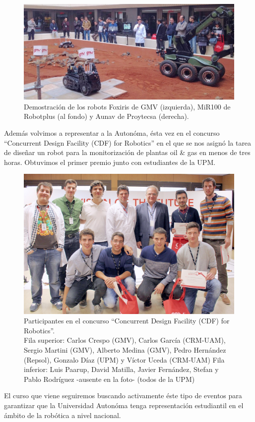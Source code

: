 \documentclass[12pt,twoside]{report}
\begin{document}
\begin{figure}[hbtp]
\centerline{\includegraphics[width=0.75\linewidth]{fotos/2015_V_JornadaRobotica_GMV}}
\caption*{
Demostración de los robots Foxiris de GMV (izquierda), MiR100 de Robotplus (al fondo) y Aunav de Proytecsa (derecha).
}
\end{figure}

Además volvimos a representar a la Autonóma, ésta vez en el concurso ``Concurrent Design Facility (CDF) for Robotics'' en el que se nos asignó la tarea de diseñar un robot para la monitorización de plantas oil \& gas en menos de tres horas. Obtuvimos el primer premio junto con estudiantes de la UPM.


\begin{figure}[hbtp]
\centerline{\includegraphics[width=0.75\linewidth]{fotos/2015_V_JornadaRobotica_GMV_team}}
\caption*{
Participantes en el concurso ``Concurrent Design Facility (CDF) for Robotics''. \\
Fila superior: Carlos Crespo (GMV), Carlos García (CRM-UAM), Sergio Martini (GMV), Alberto Medina (GMV), Pedro Hernández (Repsol), Gonzalo Díaz (UPM) y Víctor Uceda (CRM-UAM)
Fila inferior: Luis Paarup, David Matilla, Javier Fernández, Stefan y Pablo Rodríguez -ausente en la foto- (todos de la UPM)
}
\end{figure}


El curso que viene seguiremos buscando activamente éste tipo de eventos para garantizar que la Universidad Autonóma tenga representación estudiantil en el ámbito de la robótica a nivel nacional.
\end{document}
